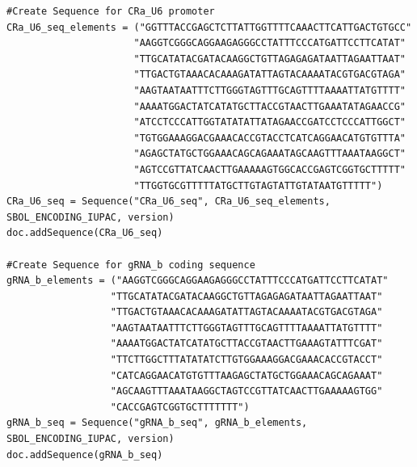 \vspace{\abovedisplayskip}
\begin{minipage}{0.95\textwidth}%
\begin{lstlisting}[basicstyle=\tt\footnotesize]
#Create Sequence for CRa_U6 promoter
CRa_U6_seq_elements = ("GGTTTACCGAGCTCTTATTGGTTTTCAAACTTCATTGACTGTGCC" 
                      "AAGGTCGGGCAGGAAGAGGGCCTATTTCCCATGATTCCTTCATAT" 
                      "TTGCATATACGATACAAGGCTGTTAGAGAGATAATTAGAATTAAT" 
                      "TTGACTGTAAACACAAAGATATTAGTACAAAATACGTGACGTAGA" 
                      "AAGTAATAATTTCTTGGGTAGTTTGCAGTTTTAAAATTATGTTTT" 
                      "AAAATGGACTATCATATGCTTACCGTAACTTGAAATATAGAACCG" 
                      "ATCCTCCCATTGGTATATATTATAGAACCGATCCTCCCATTGGCT" 
                      "TGTGGAAAGGACGAAACACCGTACCTCATCAGGAACATGTGTTTA" 
                      "AGAGCTATGCTGGAAACAGCAGAAATAGCAAGTTTAAATAAGGCT" 
                      "AGTCCGTTATCAACTTGAAAAAGTGGCACCGAGTCGGTGCTTTTT" 
                      "TTGGTGCGTTTTTATGCTTGTAGTATTGTATAATGTTTTT")
CRa_U6_seq = Sequence("CRa_U6_seq", CRa_U6_seq_elements, SBOL_ENCODING_IUPAC, version)
doc.addSequence(CRa_U6_seq)

#Create Sequence for gRNA_b coding sequence
gRNA_b_elements = ("AAGGTCGGGCAGGAAGAGGGCCTATTTCCCATGATTCCTTCATAT" 
                  "TTGCATATACGATACAAGGCTGTTAGAGAGATAATTAGAATTAAT" 
                  "TTGACTGTAAACACAAAGATATTAGTACAAAATACGTGACGTAGA" 
                  "AAGTAATAATTTCTTGGGTAGTTTGCAGTTTTAAAATTATGTTTT" 
                  "AAAATGGACTATCATATGCTTACCGTAACTTGAAAGTATTTCGAT" 
                  "TTCTTGGCTTTATATATCTTGTGGAAAGGACGAAACACCGTACCT" 
                  "CATCAGGAACATGTGTTTAAGAGCTATGCTGGAAACAGCAGAAAT" 
                  "AGCAAGTTTAAATAAGGCTAGTCCGTTATCAACTTGAAAAAGTGG" 
                  "CACCGAGTCGGTGCTTTTTTT")
gRNA_b_seq = Sequence("gRNA_b_seq", gRNA_b_elements, SBOL_ENCODING_IUPAC, version)
doc.addSequence(gRNA_b_seq)


\end{lstlisting}
\end{minipage}

